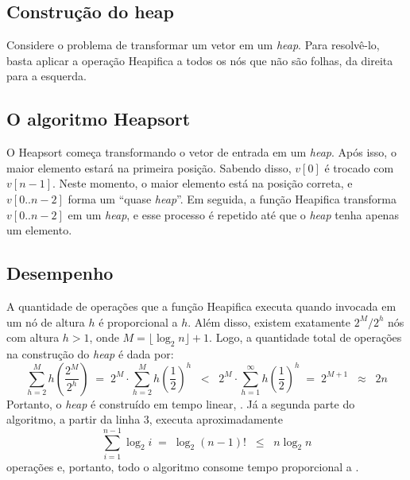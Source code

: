 \subsection*{Construção do heap}
Considere o problema de transformar um vetor em um \textit{heap}. Para resolvê-lo, basta aplicar a operação Heapifica a todos os nós que não são folhas, da direita para a esquerda.


\subsection*{O algoritmo Heapsort}
O Heapsort começa transformando o vetor de entrada em um \textit{heap}. Após isso, o maior elemento estará na primeira posição. Sabendo disso, $v[0]$ é trocado com $v[n - 1]$. Neste momento, o maior elemento está na posição correta, e $v[0..n - 2]$ forma um “quase \textit{heap}”. Em seguida, a função Heapifica transforma $v[0..n - 2]$ em um \textit{heap}, e esse processo é repetido até que o \textit{heap} tenha apenas um elemento.


\subsection*{Desempenho}
A quantidade de operações que a função Heapifica executa quando invocada em um nó de altura $h$ é proporcional a $h$. Além disso, existem exatamente $2^M / 2^h$ nós com altura $h > 1$, onde $M = \lfloor \log_2 n \rfloor + 1$. Logo, a quantidade total de operações na construção do \textit{heap} é dada por:
\[
\sum_{h=2}^{M} h\left(\frac{2^M}{2^h}\right) \;=\; 2^M\cdot\sum_{h=2}^{M} h\left(\frac{1}{2}\right)^h \;\;<\;\; 2^M\cdot\sum_{h=1}^{\infty} h\left(\frac{1}{2}\right)^h \;=\; 2^{M+1} \;\;\approx\;\; 2n
\]
Portanto, o \textit{heap} é construído em tempo linear, . Já a segunda parte do algoritmo, a partir da linha 3, executa aproximadamente
\[
\sum_{i=1}^{n-1} \log_2 i \;=\; \log_2 (n-1)! \;\;\leq\;\; n\log_2 n
\]
operações e, portanto, todo o algoritmo consome tempo proporcional a .
